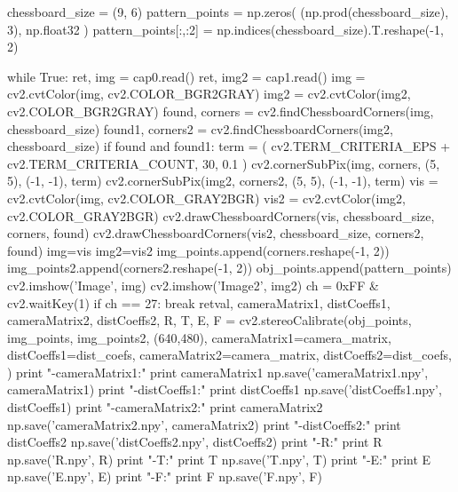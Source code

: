 \documentclass{article}
\begin{document}
\begin{python}
chessboard_size = (9, 6)
pattern_points = np.zeros( (np.prod(chessboard_size), 3), np.float32 )
pattern_points[:,:2] = np.indices(chessboard_size).T.reshape(-1, 2)

while True:
	ret, img = cap0.read()
	ret, img2 = cap1.read()
	img = cv2.cvtColor(img, cv2.COLOR_BGR2GRAY)
	img2 = cv2.cvtColor(img2, cv2.COLOR_BGR2GRAY)
	found, corners = cv2.findChessboardCorners(img, chessboard_size)
	found1, corners2 = cv2.findChessboardCorners(img2, chessboard_size)
	if found and found1:
		term = ( cv2.TERM_CRITERIA_EPS + cv2.TERM_CRITERIA_COUNT, 30, 0.1 )
		cv2.cornerSubPix(img, corners, (5, 5), (-1, -1), term)
		cv2.cornerSubPix(img2, corners2, (5, 5), (-1, -1), term)
		vis = cv2.cvtColor(img, cv2.COLOR_GRAY2BGR)
		vis2 = cv2.cvtColor(img2, cv2.COLOR_GRAY2BGR)
		cv2.drawChessboardCorners(vis, chessboard_size, corners, found)
		cv2.drawChessboardCorners(vis2, chessboard_size, corners2, found)
		img=vis
		img2=vis2
		img_points.append(corners.reshape(-1, 2))
		img_points2.append(corners2.reshape(-1, 2))
		obj_points.append(pattern_points)
	cv2.imshow('Image', img)
	cv2.imshow('Image2', img2)
	ch = 0xFF & cv2.waitKey(1)
	if ch == 27:
		break	
retval, cameraMatrix1, distCoeffs1, cameraMatrix2, distCoeffs2, R, T, E, F = cv2.stereoCalibrate(obj_points,
																							img_points,
																							img_points2,
																							(640,480),
																							cameraMatrix1=camera_matrix,
																							distCoeffs1=dist_coefs,
																							cameraMatrix2=camera_matrix,
																							distCoeffs2=dist_coefs,
																							)
print "-cameraMatrix1:"
print cameraMatrix1
np.save('cameraMatrix1.npy', cameraMatrix1)
print "-distCoeffs1:"
print distCoeffs1
np.save('distCoeffs1.npy', distCoeffs1)
print "-cameraMatrix2:"
print cameraMatrix2
np.save('cameraMatrix2.npy', cameraMatrix2)
print "-distCoeffs2:"
print distCoeffs2
np.save('distCoeffs2.npy', distCoeffs2)
print "-R:"
print R
np.save('R.npy', R)
print "-T:"
print T
np.save('T.npy', T)
print "-E:"
print E
np.save('E.npy', E)
print "-F:"
print F
np.save('F.npy', F)


\end{python}

\newpage

\end{document}
